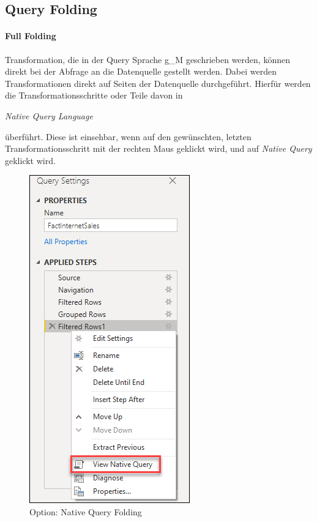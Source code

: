 \subsection{Query Folding}
\paragraph{Full Folding}
Transformation, die in der Query Sprache \gls{g_M} geschrieben werden, können direkt bei der Abfrage an die Datenquelle gestellt werden. Dabei werden Transformationen direkt auf Seiten der Datenquelle durchgeführt. Hierfür werden die Transformationsschritte oder Teile davon in 
\begin{center}
	\textit{Native Query Language}
\end{center}
überführt. Diese ist einsehbar, wenn auf den gewünschten, letzten Transformationsschritt mit der rechten Maus geklickt wird, und auf \textit{Native Query} geklickt wird.
\begin{figure}[H]
	\centering
	\includegraphics[scale = 0.3]{attachment/chapter_1/Scc166}
	\caption{Option: Native Query Folding}
\end{figure}
